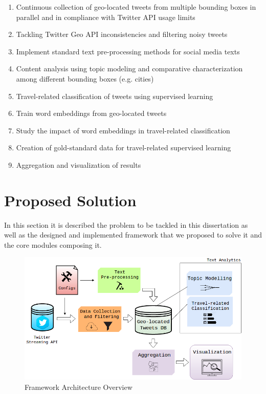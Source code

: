 \documentclass[9pt,a4paper]{extarticle}
\begin{document}
\begin{multicols}{2}
\begin{enumerate}
	\item Continuous collection of geo-located tweets from multiple bounding boxes in parallel and in compliance with Twitter API usage limits
	\item Tackling Twitter Geo API inconsistencies and filtering noisy tweets
	\item Implement standard text pre-processing methods for social media texts
	\item Content analysis using topic modeling and comparative characterization among different bounding boxes (e.g. cities)
	\item Travel-related classification of tweets using supervised learning
	\item Train word embeddings from geo-located tweets
	\item Study the impact of word embeddings in travel-related classification
	\item Creation of gold-standard data for travel-related supervised learning
	\item Aggregation and visualization of results
\end{enumerate}

\section{Proposed Solution}\label{sec:work}

In this section it is described the problem to be tackled in this dissertation as well as the designed and implemented framework that we proposed to solve it and the core modules composing it.

\begin{figure}[H]
\centerline{\includegraphics[scale=.25]{architecture.png}}
\caption{Framework Architecture Overview}  
\label{fig:architecture}
\end{figure}


\end{multicols}
\end{document}
